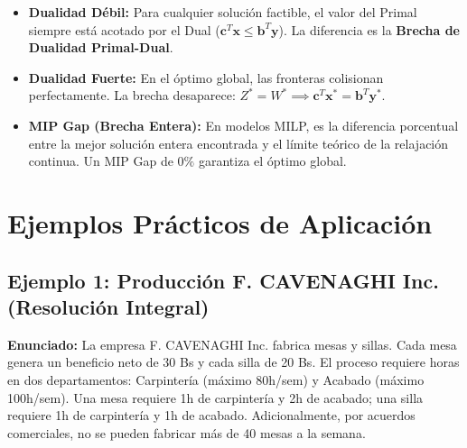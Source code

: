 \documentclass{article}
\begin{document}
	
	\begin{itemize}
		\item \textbf{Dualidad Débil:} Para cualquier solución factible, el valor del Primal siempre está acotado por el Dual ($ \mathbf{c}^T \mathbf{x} \leq \mathbf{b}^T \mathbf{y} $). La diferencia es la \textbf{Brecha de Dualidad Primal-Dual}.
		\item \textbf{Dualidad Fuerte:} En el óptimo global, las fronteras colisionan perfectamente. La brecha desaparece: $Z^* = W^* \implies \mathbf{c}^T \mathbf{x}^* = \mathbf{b}^T \mathbf{y}^*$.
		\item \textbf{MIP Gap (Brecha Entera):} En modelos MILP, es la diferencia porcentual entre la mejor solución entera encontrada y el límite teórico de la relajación continua. Un MIP Gap de $0\%$ garantiza el óptimo global.
	\end{itemize}
	
	\newpage

	\section{Ejemplos Prácticos de Aplicación}
	
	\subsection{Ejemplo 1: Producción F. CAVENAGHI Inc. (Resolución Integral)}
	
	\textbf{Enunciado:} La empresa F. CAVENAGHI Inc. fabrica mesas y sillas. Cada mesa genera un beneficio neto de 30 Bs y cada silla de 20 Bs. El proceso requiere horas en dos departamentos: Carpintería (máximo 80h/sem) y Acabado (máximo 100h/sem). Una mesa requiere 1h de carpintería y 2h de acabado; una silla requiere 1h de carpintería y 1h de acabado. Adicionalmente, por acuerdos comerciales, no se pueden fabricar más de 40 mesas a la semana.
	
\end{document}
